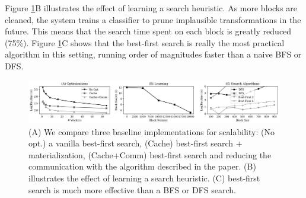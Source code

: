 Figure \ref{fig:opt}B illustrates the effect of learning a search heuristic. As more blocks are cleaned, the system trains a classifier to prune implausible transformations in the future.
This means that the search time spent on each block is greatly reduced (75\%). 
Figure \ref{fig:opt}C shows that the best-first search is really the most practical algorithm in this setting, running order of magnitudes faster than a naive BFS or DFS.

 \begin{figure}[ht]
\centering
 \includegraphics[width=\textwidth]{exp/exp6.png}
 \caption{(A) We compare three baseline implementations for scalability: (No opt.) a vanilla best-first search, (Cache) best-first search + materialization, (Cache+Comm) best-first search and reducing the communication with the algorithm described in the paper. (B) illustrates the effect of learning a search heuristic. (C) best-first search is much more effective than a BFS or DFS search.
 \label{fig:opt}}
\end{figure}

